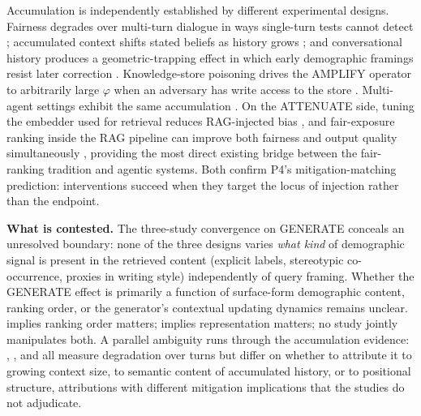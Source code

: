 \documentclass[acmsmall,nonacm]{acmart}
\begin{document}
Accumulation is independently established by different experimental designs. Fairness degrades over multi-turn dialogue in ways single-turn tests cannot detect \cite{fan2024fairmt}; accumulated context shifts stated beliefs as history grows \cite{geng2025accumulating}; and conversational history produces a geometric-trapping effect in which early demographic framings resist later correction \cite{simhi2026old}. Knowledge-store poisoning drives the AMPLIFY operator to arbitrarily large $\varphi$ when an adversary has write access to the store \cite{wang2025bias}. Multi-agent settings exhibit the same accumulation \cite{coppolillo2025unmasking}. On the ATTENUATE side, tuning the embedder used for retrieval reduces RAG-injected bias \cite{kim2025mitigating}, and fair-exposure ranking inside the RAG pipeline can improve both fairness and output quality simultaneously \cite{kim2024fair}, providing the most direct existing bridge between the fair-ranking tradition \cite{zehlike2022fairness} and agentic systems. Both confirm P4's mitigation-matching prediction: interventions succeed when they target the locus of injection rather than the endpoint.

\textbf{What is contested.} The three-study convergence on GENERATE conceals an unresolved boundary: none of the three designs varies \emph{what kind} of demographic signal is present in the retrieved content (explicit labels, stereotypic co-occurrence, proxies in writing style) independently of query framing. Whether the GENERATE effect is primarily a function of surface-form demographic content, ranking order, or the generator's contextual updating dynamics remains unclear. \cite{kim2024fair} implies ranking order matters; \cite{kim2025mitigating} implies representation matters; no study jointly manipulates both. A parallel ambiguity runs through the accumulation evidence: \cite{fan2024fairmt}, \cite{geng2025accumulating}, and \cite{simhi2026old} all measure degradation over turns but differ on whether to attribute it to growing context size, to semantic content of accumulated history, or to positional structure, attributions with different mitigation implications that the studies do not adjudicate.
\end{document}

